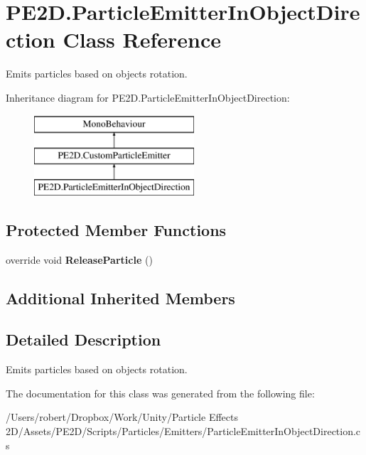 \hypertarget{class_p_e2_d_1_1_particle_emitter_in_object_direction}{}\section{P\+E2\+D.\+Particle\+Emitter\+In\+Object\+Direction Class Reference}
\label{class_p_e2_d_1_1_particle_emitter_in_object_direction}


Emits particles based on objects rotation.  


Inheritance diagram for P\+E2\+D.\+Particle\+Emitter\+In\+Object\+Direction\+:\begin{figure}[H]
\begin{center}
\leavevmode
\includegraphics[height=3.000000cm]{class_p_e2_d_1_1_particle_emitter_in_object_direction}
\end{center}
\end{figure}
\subsection*{Protected Member Functions}
\begin{DoxyCompactItemize}
\item 
\hypertarget{class_p_e2_d_1_1_particle_emitter_in_object_direction_a9f5e6461f1998fbda78e1da8c13176ef}{}override void {\bfseries Release\+Particle} ()\label{class_p_e2_d_1_1_particle_emitter_in_object_direction_a9f5e6461f1998fbda78e1da8c13176ef}

\end{DoxyCompactItemize}
\subsection*{Additional Inherited Members}


\subsection{Detailed Description}
Emits particles based on objects rotation. 



The documentation for this class was generated from the following file\+:\begin{DoxyCompactItemize}
\item 
/\+Users/robert/\+Dropbox/\+Work/\+Unity/\+Particle Effects 2\+D/\+Assets/\+P\+E2\+D/\+Scripts/\+Particles/\+Emitters/Particle\+Emitter\+In\+Object\+Direction.\+cs\end{DoxyCompactItemize}
